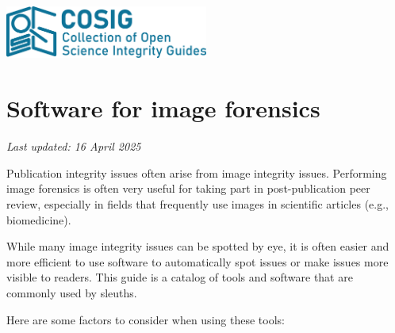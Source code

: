 \documentclass[letterpaper, 12pt]{article}
\begin{document}
\flushleft
\includegraphics[width=0.5\textwidth]{img/home/241017_final_logo_mockup.png}

\section*{Software for image forensics}
\textit{Last updated: 16 April 2025}

Publication integrity issues often arise from image integrity issues. Performing image forensics is often very useful for taking part in post-publication peer review, especially in fields that frequently use images in scientific articles (e.g., biomedicine).

While many image integrity issues can be spotted by eye, it is often easier and more efficient to use software to automatically spot issues or make issues more visible to readers. This guide is a catalog of tools and software that are commonly used by sleuths.

Here are some factors to consider when using these tools:
\end{document}
